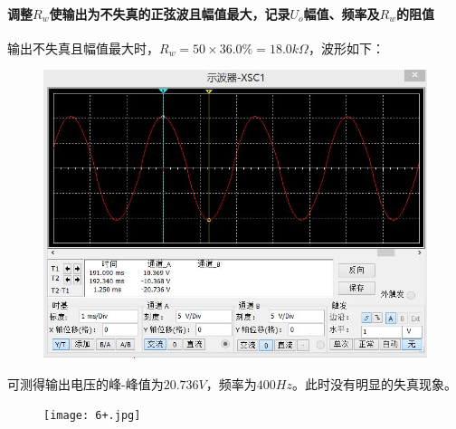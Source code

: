 \documentclass[12pt,a4paper]{article}
\begin{document}
\begin{spacing}{1.3}
\paragraph{调整$R_w$使输出为不失真的正弦波且幅值最大，记录$U_o$幅值、频率及$R_w$的阻值} 输出不失真且幅值最大时，$R_w = 50\times 36.0\% = 18.0k\Omega$，波形如下：
\begin{figure}[H]
\centering
\includegraphics[width=\textwidth]{6-.jpg}
\end{figure}
可测得输出电压的峰-峰值为$20.736V$，频率为$400Hz$。此时没有明显的失真现象。
\begin{figure}[H]
\centering
\texttt{[image: 6+.jpg]}
\end{figure}

\end{spacing}
\end{document}
